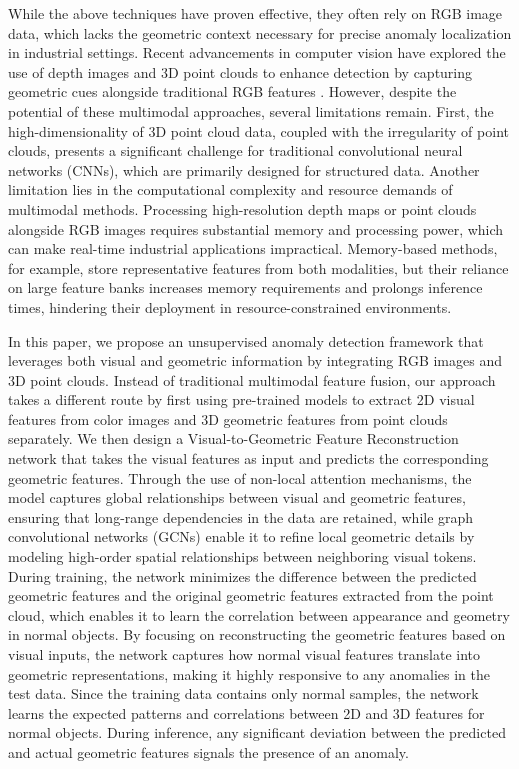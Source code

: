 While the above techniques have proven effective, they often rely on RGB image data, which lacks the geometric context necessary for precise anomaly localization in industrial settings. Recent advancements in computer vision have explored the use of depth images and 3D point clouds to enhance detection by capturing geometric cues alongside traditional RGB features \cite{bergmann2023anomaly, rudolph2023asymmetric, horwitz2023back, wang2023multimodal}. However, despite the potential of these multimodal approaches, several limitations remain. First, the high-dimensionality of 3D point cloud data, coupled with the irregularity of point clouds, presents a significant challenge for traditional convolutional neural networks (CNNs), which are primarily designed for structured data. Another limitation lies in the computational complexity and resource demands of multimodal methods. Processing high-resolution depth maps or point clouds alongside RGB images requires substantial memory and processing power, which can make real-time industrial applications impractical. Memory-based methods, for example, store representative features from both modalities, but their reliance on large feature banks increases memory requirements and prolongs inference times, hindering their deployment in resource-constrained environments.

In this paper, we propose an unsupervised anomaly detection framework that leverages both visual and geometric information by integrating RGB images and 3D point clouds. Instead of traditional multimodal feature fusion, our approach takes a different route by first using pre-trained models to extract 2D visual features from color images and 3D geometric features from point clouds separately. We then design a Visual-to-Geometric Feature Reconstruction network that takes the visual features as input and predicts the corresponding geometric features. Through the use of non-local attention mechanisms, the model captures global relationships between visual and geometric features, ensuring that long-range dependencies in the data are retained, while graph convolutional networks (GCNs) enable it to refine local geometric details by modeling high-order spatial relationships between neighboring visual tokens. During training, the network minimizes the difference between the predicted geometric features and the original geometric features extracted from the point cloud, which enables it to learn the correlation between appearance and geometry in normal objects. By focusing on reconstructing the geometric features based on visual inputs, the network captures how normal visual features translate into geometric representations, making it highly responsive to any anomalies in the test data. Since the training data contains only normal samples, the network learns the expected patterns and correlations between 2D and 3D features for normal objects. During inference, any significant deviation between the predicted and actual geometric features signals the presence of an anomaly.

